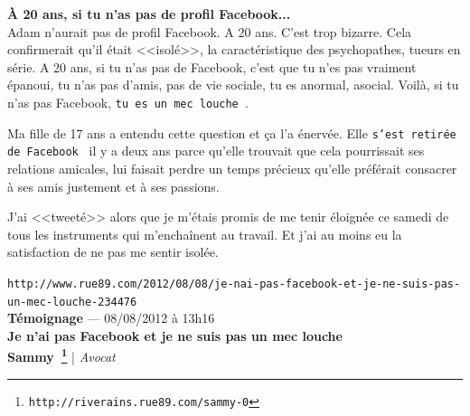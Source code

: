 \documentclass[11pt,twoside,a4paper]{article}
\begin{document}

\textbf{{\`A} 20 ans, si tu n'as pas de profil Facebook...}~\\

Adam n'aurait pas de profil Facebook. A 20 ans. C'est trop bizarre. Cela confirmerait qu'il {\'e}tait <<isol{\'e}>>, la caract{\'e}ristique des psychopathes, tueurs en s{\'e}rie. A 20 ans, si tu n'as pas de Facebook, c'est que tu n'es pas vraiment {\'e}panoui, tu n'as pas d'amis, pas de vie sociale, tu es anormal, asocial. Voil{\`a}, si tu n'as pas Facebook, \texttt{tu es un mec louche~\footnotemark}. ~\\

Ma fille de 17 ans a entendu cette question et \c{c}a l'a {\'e}nerv{\'e}e. Elle \texttt{s'est retir{\'e}e de Facebook~\footnotemark} il y a deux ans parce qu'elle trouvait que cela pourrissait ses relations amicales, lui faisait perdre un temps pr{\'e}cieux qu'elle pr{\'e}f{\'e}rait consacrer {\`a} ses amis justement et {\`a} ses passions.

J'ai <<tweet{\'e}>> alors que je m'{\'e}tais promis de me tenir {\'e}loign{\'e}e ce samedi de tous les instruments qui m'encha{\^i}nent au travail. Et j'ai au moins eu la satisfaction de ne pas me sentir isol{\'e}e. ~\\

\clearpage

\texttt{http://www.rue89.com/2012/08/08/je-nai-pas-facebook-et-je-ne-suis-pas-un-mec-louche-234476}~\\

\textbf{T{\'e}moignage} --- 08/08/2012 {\`a} 13h16\\

\textbf{\LARGE Je n'ai pas Facebook et je ne suis pas un mec louche}~\\

{\small \textbf{Sammy~\footnote{\texttt{http://riverains.rue89.com/sammy-0}}} | \emph{Avocat} }~\\
\end{document}
